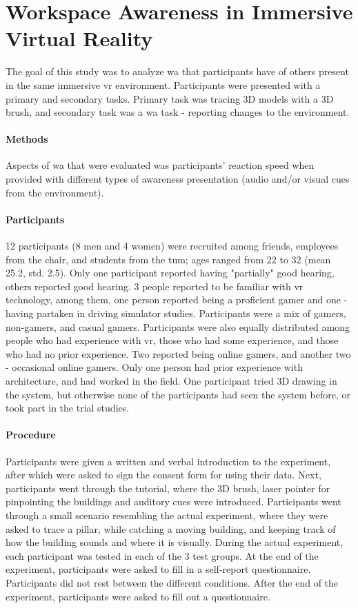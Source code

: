 \section{Workspace Awareness in Immersive Virtual Reality}
\label{final_study}
The goal of this study was to analyze \gls{wa} that participants have of others present in the same immersive \gls{vr} environment. Participants were presented with a primary and secondary tasks. Primary task was tracing 3D models with a 3D brush, and secondary task was a \gls{wa} task - reporting changes to the environment.

\paragraph{Methods}
Aspects of \gls{wa} that were evaluated was participants’ reaction speed when provided with different types of awareness presentation (audio and/or visual cues from the environment).

\paragraph{Participants}
12 participants (8 men and 4 women) were recruited among friends, employees from the chair, and students from the \gls{tum}; ages ranged from 22 to 32 (mean 25.2, std. 2.5). Only one participant reported having "partially" good hearing, others reported good hearing. 3 people reported to be familiar with \gls{vr} technology, among them, one person reported being a proficient gamer and one - having partaken in driving simulator studies. Participants were a mix of gamers, non-gamers, and casual gamers. Participants were also equally distributed among people who had experience with \gls{vr}, those who had some experience, and those who had no prior experience. Two reported being online gamers, and another two - occasional online gamers. Only one person had prior experience with architecture, and had worked in the field. One participant tried 3D drawing in the system, but otherwise none of the participants had seen the system before, or took part in the trial studies.

\paragraph{Procedure}
Participants were given a written and verbal introduction to the experiment,
after which were asked to sign the consent form for using their data. %
Next, participants went through the tutorial, where the 3D brush, laser pointer for pinpointing the buildings and auditory cues were introduced. Participants went through a small scenario resembling the actual experiment, where they were asked to trace a pillar, while catching a moving building, and keeping track of how the building sounds and where it is visually.
During the actual experiment, each participant was tested in each of the 3 test groups.
At the end of the experiment, participants were asked to fill in a self-report questionnaire.
Participants did not rest between the different conditions. 
After the end of the experiment, participants were asked to fill out a questionnaire. %

